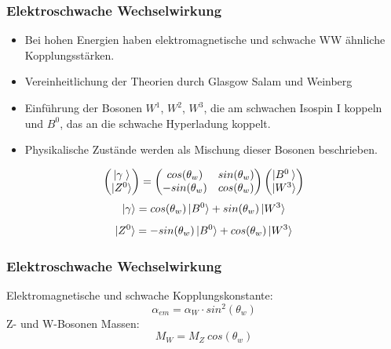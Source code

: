 \begin{frame}
	\frametitle{Elektroschwache Wechselwirkung}
	\begin{center}
		\begin{itemize}
			\item
			Bei hohen Energien haben elektromagnetische und schwache WW ähnliche Kopplungsstärken.
			\item
			Vereinheitlichung der Theorien durch Glasgow Salam und Weinberg
			\item
			Einführung der Bosonen $W^1$, $W^2$, $W^3$, die am schwachen Isospin I koppeln und $B^0$, das an die schwache Hyperladung koppelt.
			\item
			Physikalische Zustände werden als Mischung dieser Bosonen beschrieben.
		\end{itemize}
		\begin{equation*}
		\begin{pmatrix}
		\ket{\gamma\;}\\
		\ket{Z^0}
		\end{pmatrix} = 
		\begin{pmatrix}
		cos(\theta_w) & sin(\theta_w)\\
		-sin(\theta_w) & cos(\theta_w)\\
		\end{pmatrix}
		\begin{pmatrix}
		\ket{B^0\:}\\
		\ket{W^3}
		\end{pmatrix}
		\end{equation*}
		\begin{equation*}
			\ket{\gamma} =  cos(\theta_w)\ket{B^0} + sin(\theta_w) \ket{W^3}
		\end{equation*}
		\begin{equation*}
		\ket{Z^0} = -sin(\theta_w) \ket{B^0} + cos(\theta_w) \ket{W^3}
		\end{equation*}
	\end{center}
\end{frame}
\begin{frame}
	\frametitle{Elektroschwache Wechselwirkung}
	\begin{center}
		Elektromagnetische und schwache Kopplungskonstante:
		\begin{equation*}
		\alpha_{em} = \alpha_W \cdot sin^2(\theta_w)
		\end{equation*}
		Z- und W-Bosonen Massen:
		\begin{equation*}
		M_W = M_Z~cos(\theta_w)
		\end{equation*}
		
	\end{center}
\end{frame}
